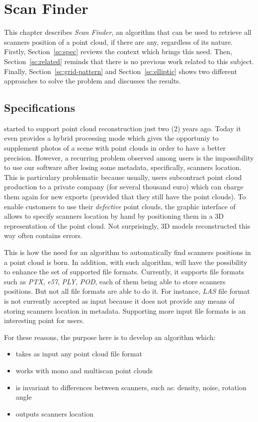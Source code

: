 \chapter{Scan Finder}
\label{ch:scanfinder}
This chapter describes \emph{Scan Finder}, an algorithm that can be used to retrieve all scanners position of a point cloud,  if there are any, regardless of its nature. Firstly, Section~\ref{sc:spec} reviews the context which brings this need. Then, Section~\ref{sc:related} reminds that there is no previous work related to this subject. Finally, Section~\ref{sc:grid-pattern} and Section~\ref{sc:elliptic} shows two different approaches to solve the problem and discusses the results.

\section{Specifications}
\CC started to support point cloud reconstruction just two (2) years ago. Today it even provides a hybrid processing mode which gives the opportuniy to supplement photos of a scene with point clouds in order to have a better precision. However, a recurring problem observed among \CC users is the impossibility to use our software after losing some metadata, specifically, scanners location. This is particulary problematic because usually, \CC users subcontract point cloud
production
to a private company (for several thousand euro) which can charge them again for new exports (provided that they still have the point clouds). To enable customers to use their \emph{defective} point clouds, the graphic interface of \CC allows to specify scanners location by hand by positioning them in a 3D representation of the point cloud. Not surprisingly, 3D models reconstructed this way often contains errors.

This is how the need for an algorithm to automatically find scanners positions in a point cloud is born. In addition, with such algorithm, \CC will have the possibility to enhance the set of supported file formats. Currently, it supports file formats such as \emph{PTX}, \emph{e57}, \emph{PLY}, \emph{POD}, each of them being able to store scanners positions. But not all file formats are able to do it. For instance, \emph{LAS} file format is not currently accepted as input because it does not provide any
means of storing scanners location in metadata. Supporting more input file formats is an interesting point for \CC users.

For these reasons, the purpose here is to develop an algorithm which:
\begin{itemize}
\item takes as input any point cloud file format
\item works with mono and multiscan point clouds
\item is invariant to differences between scanners, such as: density, noise, rotation angle
\item outputs scanners location
\end{itemize}

